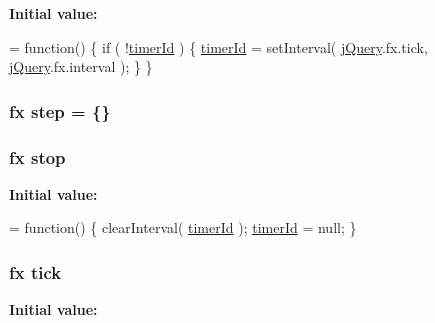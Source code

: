 {\bfseries Initial value\-:}
\begin{DoxyCode}
= \textcolor{keyword}{function}() \{
    \textcolor{keywordflow}{if} ( !\hyperlink{jquery-1_810_82_8js_aa447439fbe7027e58837a297297c9d8a}{timerId} ) \{
        \hyperlink{jquery-1_810_82_8js_aa447439fbe7027e58837a297297c9d8a}{timerId} = setInterval( \hyperlink{jquery-1_810_82_8js_a5e01048fbd3a30b44e8d491d8945c457}{jQuery}.fx.tick, \hyperlink{jquery-1_810_82_8js_a5e01048fbd3a30b44e8d491d8945c457}{jQuery}.fx.interval );
    \}
\}
\end{DoxyCode}
\hypertarget{jquery-1_810_82_8js_a7337229078e935a813e7e0f674fad739}{
\subsubsection[{step}]{ {\bf fx} step = \{\}}}\label{jquery-1_810_82_8js_a7337229078e935a813e7e0f674fad739}
\hypertarget{jquery-1_810_82_8js_ac9a544302040b74e845b33c285cd10e7}{
\subsubsection[{stop}]{ {\bf fx} stop}}\label{jquery-1_810_82_8js_ac9a544302040b74e845b33c285cd10e7}
{\bfseries Initial value\-:}
\begin{DoxyCode}
= \textcolor{keyword}{function}() \{
    clearInterval( \hyperlink{jquery-1_810_82_8js_aa447439fbe7027e58837a297297c9d8a}{timerId} );
    \hyperlink{jquery-1_810_82_8js_aa447439fbe7027e58837a297297c9d8a}{timerId} = null;
\}
\end{DoxyCode}
\hypertarget{jquery-1_810_82_8js_a4820e1fd61053b39dd3bbd8cac9f48ba}{
\subsubsection[{tick}]{ {\bf fx} tick}}\label{jquery-1_810_82_8js_a4820e1fd61053b39dd3bbd8cac9f48ba}
{\bfseries Initial value\-:}
